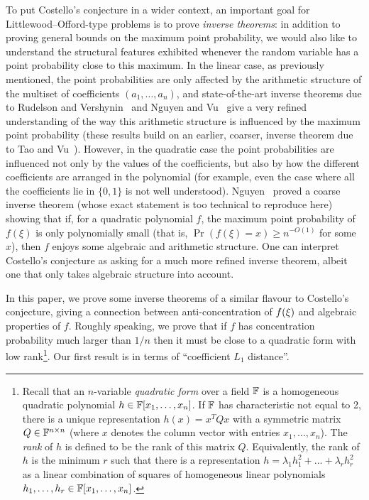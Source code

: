 \documentclass{daj}
\theoremstyle{plain}
\theoremstyle{plain}
\theoremstyle{plain}
\theoremstyle{plain}
\theoremstyle{definition}
\theoremstyle{plain}
\theoremstyle{plain}
\theoremstyle{definition}
\theoremstyle{definition}
\theoremstyle{plain}
\let\originalleft\left
\let\originalright\right
\renewcommand{\left}{\mathopen{}\mathclose\bgroup\originalleft}
\renewcommand{\right}{\aftergroup\egroup\originalright}
\begin{document}
To put Costello's conjecture in a wider context, an important goal for Littlewood--Offord-type problems is to prove \emph{inverse theorems}: in addition to proving general bounds on the maximum point probability, we would also like to understand the structural features exhibited whenever the random variable has a point probability close to this maximum. In the linear case, as previously mentioned, the point probabilities are only affected by the arithmetic structure of the multiset of coefficients $(a_{1},\dots,a_{n})$, and state-of-the-art inverse theorems due to Rudelson and Vershynin~\cite{RV08} and Nguyen and Vu~\cite{NV11} give a very refined understanding of the way this arithmetic structure is influenced by the maximum point probability (these results build on an earlier, coarser, inverse theorem due to Tao and Vu~\cite{TV09b}). However, in the quadratic case the point probabilities are influenced not only by the values of the coefficients, but also by how the different coefficients are arranged in the polynomial (for example, even the case where all the coefficients lie in $\{0,1\}$ is not well understood). Nguyen~\cite{Ngu12} proved a coarse inverse theorem (whose exact statement is too technical to reproduce here) showing that if, for a quadratic polynomial $f$, the maximum point probability of $f(\xi)$ is only polynomially small (that is, $\Pr(f(\xi)=x)\ge n^{-O(1)}$ for some $x$), then $f$ enjoys some algebraic and arithmetic structure. One can interpret Costello's conjecture as asking for a much more refined inverse theorem, albeit one that only takes algebraic structure into account.

In this paper, we prove some inverse theorems of a similar flavour to Costello's
conjecture, giving a connection between anti-concentration of $f\left(\xi\right)$ and algebraic properties of $f$. Roughly speaking, we prove that
if $f$ has concentration probability much larger than $1/n$ then
it must be close to a quadratic form with low rank\footnote{Recall that an $n$-variable \emph{quadratic form} over a field $\mathbb{F}$ is a homogeneous quadratic polynomial $h\in \mathbb{F}[x_1,\dots,x_n]$. If $\mathbb{F}$ has characteristic not equal to 2, there is a unique representation $h(x)=x^T Q x$ with a symmetric matrix $Q\in \mathbb{F}^{n\times n}$ (where $x$ denotes the column vector with entries $x_1,\dots,x_n$). The \emph{rank} of $h$ is defined to be the rank of this matrix $Q$. Equivalently, the rank of $h$ is the minimum $r$ such that there is a representation $h=\lambda_1 h_1^2+\dots+\lambda_r h_r^2$ as a linear combination of squares of homogeneous linear polynomials $h_1,\dots,h_r\in \mathbb{F}[x_1,\dots,x_n]$.}.
Our first result is in terms of ``coefficient $L_{1}$ distance''.
\end{document}
